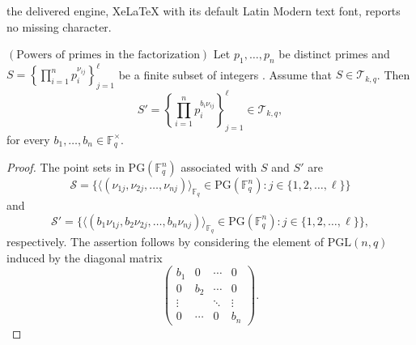 \documentclass[10pt,a4paper]{amsart}
\newcommand{\F}{{\mathbb F}}
\newcommand{\PG}{\mathrm{PG}}
\newcommand{\fq}{{\mathbb F}_{q}}
\begin{document}
the delivered engine, XeLaTeX with its default Latin Modern text font, reports no missing character.
\begin{corollary}
$\left( \text{Powers of primes in the factorization} \right)$  Let $p_1,\ldots,p_n$ be distinct primes and $S = \left\{\prod_{i=1}^{n} p_{i}^{\nu_{ij}}\right\}_{j=1}^{\ell}$ be a finite subset of integers . Assume that $S \in \mathcal{T}_{k,q}$. Then 
    \[S'=\left\{\prod_{i=1}^np_{i}^{b_i\nu_{ij}}\right\}_{j=1}^{\ell} \in \mathcal{T}_{k,q},\]
    for every $b_1,\ldots,b_{n} \in \F_q^{\times}$.
\end{corollary}

\begin{proof}
    The point sets in $\PG(\F_q^n)$ associated with $S$ and $S'$ are 
    \[
\mathcal{S} = \big\{ \langle ( \nu_{1j}, \nu_{2j}, \ldots, \nu_{nj} )\rangle_{\fq} \in\PG(\F_{q}^{n}) : j\in\{1, 2, \ldots, \ell\} \big\} \]
and
\[ \mathcal{S}' = \big\{\langle ( b_1\nu_{1j}, b_2\nu_{2j}, \ldots, b_n\nu_{nj} )\rangle_{\fq} \in\PG(\F_{q}^{n}) : j\in\{1, 2, \ldots, \ell\} \big\},
\]
respectively. The assertion follows by considering the element of $\mathrm{PGL}(n,q)$ induced by the diagonal matrix
\[
\begin{pmatrix}
    b_1 & 0 & \cdots & 0 \\
    0 & b_2 & \cdots & 0 \\
    \vdots &  & \ddots & \vdots \\
    0 & \cdots & 0 & b_n
\end{pmatrix}.
\]
\end{proof}
\end{document}
